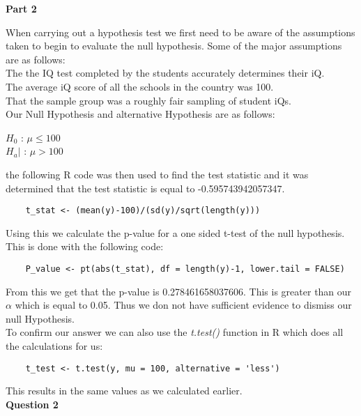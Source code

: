 \documentclass{article}
\begin{document}
\noindent\textbf{\large Part 2\\}

When carrying out a hypothesis test we first need to be aware of the assumptions taken to begin to evaluate the null hypothesis. Some of the major assumptions are as follows:\\
The the IQ test completed by the students accurately determines their iQ.\\
The average iQ score of all the schools in the country was 100.\\
That the sample group was a roughly fair sampling of student iQs.\\ 
 
Our Null Hypothesis and alternative Hypothesis are as follows:
\begin{center}
	$H_{0}$ : $\mu \leq 100$\\
	$H_{a}|$ : $\mu > 100$\\
\end{center}
the following R code was then used to find the test statistic and it was determined that the test statistic is equal to -0.595743942057347.
\begin{verbatim}
	t_stat <- (mean(y)-100)/(sd(y)/sqrt(length(y)))
\end{verbatim}
Using this we calculate the p-value for a one sided t-test of the null hypothesis. This is done with the following code:
\begin{verbatim}
	P_value <- pt(abs(t_stat), df = length(y)-1, lower.tail = FALSE)
\end{verbatim}
From this we get that the p-value is 0.278461658037606. This is greater than our $\alpha$ which is equal to 0.05. Thus we don not have sufficient evidence to dismiss our null Hypothesis.\\
To confirm our answer we can also use the \emph{t.test()} function in R which does all the calculations for us:
\begin{verbatim}
	t_test <- t.test(y, mu = 100, alternative = 'less')
\end{verbatim}
This results in the same values as we calculated earlier. \pagebreak\\

\noindent\textbf{\Large Question 2}\\
\end{document}
